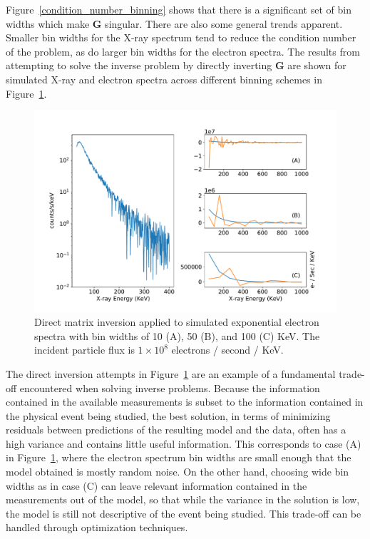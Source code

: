 Figure~\ref{condition_number_binning} shows that there is a significant set of bin widths which make $\mathbf{G}$ singular. There are also some general trends apparent. Smaller bin widths for the X-ray spectrum tend to reduce the condition number of the problem, as do larger bin widths for the electron spectra. The results from attempting to solve the inverse problem by directly inverting $\mathbf{G}$ are shown for simulated X-ray and electron spectra across different binning schemes in Figure~\ref{direct_inversion_example}.

\begin{figure}[h]
\label{direct_inversion_example}
\centering
\includegraphics[width=1.0\textwidth]{figures/fig_3.pdf}
\caption{Direct matrix inversion applied to simulated exponential electron spectra with bin widths of 10 (A), 50 (B), and 100 (C) KeV. The incident particle flux is $1\times10^8$ electrons / second / KeV. }
\end{figure}

The direct inversion attempts in Figure~\ref{direct_inversion_example} are an example of a fundamental trade-off encountered when solving inverse problems. Because the information contained in the available measurements is subset to the information contained in the physical event being studied, the best solution, in terms of minimizing residuals between predictions of the resulting model and the data, often has a high variance and contains little useful information. This corresponds to case (A) in Figure~\ref{direct_inversion_example}, where the electron spectrum bin widths are small enough that the model obtained is mostly random noise. On the other hand, choosing wide bin widths as in case (C) can leave relevant information contained in the measurements out of the model, so that while the variance in the solution is low, the model is still not descriptive of the event being studied. This trade-off can be handled through optimization techniques.

